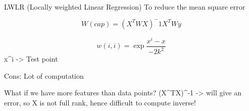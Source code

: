 LWLR (Locally weighted Linear Regression)
To reduce the mean square error

$$
W(cap) = (X^TWX)^-1X^TWy
$$

$$
w(i,i) = \exp{\frac{x^i - x}{-2k^2}}
$$
x^i -> Test point

Cons: Lot of computation


What if we have more features than data points?
(X^TX)^-1 -> will give an error, so X is not full rank, hence difficult to compute inverse!